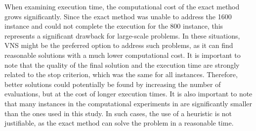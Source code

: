 \documentclass[sn-nature]{sn-jnl}%
\theoremstyle{thmstyleone}%
\theoremstyle{thmstyletwo}%
\theoremstyle{thmstylethree}%
\begin{document}
When examining execution time, the computational cost of the exact method grows significantly. Since the exact method was unable to address the 1600 instance and could not complete the execution for the 800 instance, this represents a significant drawback for large-scale problems. In these situations, VNS might be the preferred option to address such problems, as it can find reasonable solutions with a much lower computational cost. It is important to note that the quality of the final solution and the execution time are strongly related to the stop criterion, which was the same for all instances. Therefore, better solutions could potentially be found by increasing the number of evaluations, but at the cost of longer execution times. It is also important to note that many instances in the computational experiments in \cite{rajabi2023utilizing} are significantly smaller than the ones used in this study. In such cases, the use of a heuristic is not justifiable, as the exact method can solve the problem in a reasonable time.


\end{document}
